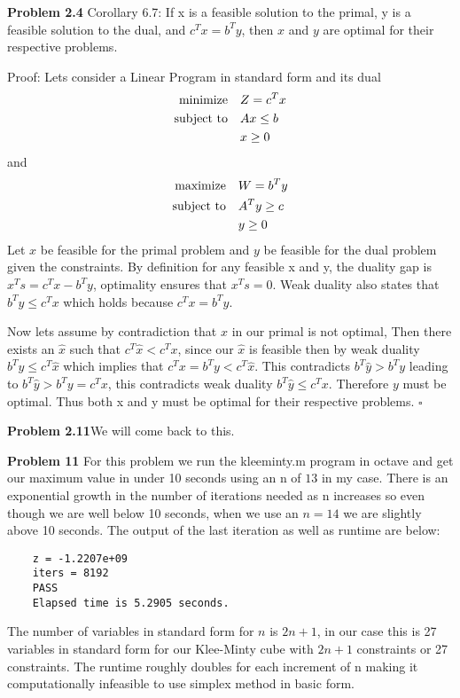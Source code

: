 \documentclass{article}
\begin{document}
\textbf{Problem 2.4} Corollary 6.7: If x is a feasible solution to the primal, y is a feasible solution to the dual,
and $c^Tx = b^Ty$, then $x$ and $y$ are optimal for their respective problems.

Proof: Lets consider a Linear Program in standard form and its dual
\begin{align*}
    \text{minimize} &\null \quad Z = c^Tx \\
    \text{subject to} &\null \quad Ax \leq b \\
     &\null \quad x \geq 0
\end{align*}
and
\begin{align*}
    \text{maximize} &\null \quad W = b^Ty \\
    \text{subject to} &\null \quad A^Ty \geq c \\
     &\null \quad y \geq 0
\end{align*}
Let $x$ be feasible for the primal problem and $y$ be feasible for the dual problem given the constraints. By definition for any feasible x and y, the duality gap is $x^Ts = c^Tx - b^Ty$, optimality ensures that $x^Ts = 0$. Weak duality also states that $b^Ty \leq c^Tx$ which holds because $c^Tx = b^Ty$. 

Now lets assume by contradiction that $x$ in our primal is not optimal, Then there exists an $\hat{x}$ such that $c^T\hat{x} < c^Tx$, since our $\hat{x}$ is feasible then by weak duality $b^Ty \leq c^T\hat{x}$ which implies that $c^Tx = b^Ty < c^T\hat{x}$. This contradicts $b^T\hat{y} > b^Ty$ leading to $b^T\hat{y} > b^Ty = c^Tx$, this contradicts weak duality $b^T\hat{y} \leq c^Tx$. Therefore $y$ must be optimal. Thus both x and y must be optimal for their respective problems. $\square$
\newline

\textbf{Problem 2.11}We will come back to this.

\textbf{Problem 11} For this problem we run the kleeminty.m program in octave and get our maximum value in under 10 seconds using an n of $13$ in my case. There is an exponential growth in the number of iterations needed as n increases so even though we are well below 10 seconds, when we use an $n=14$ we are slightly above 10 seconds. The output of the last iteration as well as runtime are below:

\begin{lstlisting}
    z = -1.2207e+09
    iters = 8192
    PASS
    Elapsed time is 5.2905 seconds.
\end{lstlisting}
The number of variables in standard form for $n$ is $2n+1$, in our case this is 27 variables in standard form for our Klee-Minty cube with $2n+1$ constraints or 27 constraints. The runtime roughly doubles for each increment of n making it computationally  infeasible to use simplex method in basic form.
\end{document}
